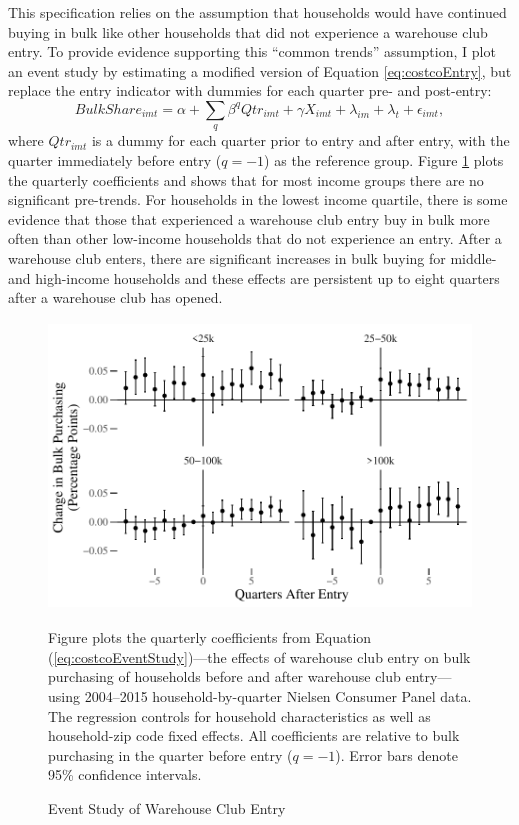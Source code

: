 \documentclass[AER]{AEA_mal}
\begin{document}
This specification relies on the assumption that households would have continued buying in bulk like other households that did not experience a warehouse club entry. To provide evidence supporting this ``common trends'' assumption, I plot an event study by estimating a modified version of Equation \ref{eq:costcoEntry}, but replace the entry indicator with dummies for each quarter pre- and post-entry:
\begin{equation}
\label{eq:costcoEventStudy}
BulkShare_{imt} = \alpha + \sum_q \beta^q Qtr_{imt} + \gamma X_{imt} + \lambda_{im} + \lambda_t + \epsilon_{imt},
\end{equation}
where $Qtr_{imt}$ is a dummy for each quarter prior to entry and after entry, with the quarter immediately before entry ($q = -1$) as the reference group. Figure \ref{fig:eventStudyIncome} plots the quarterly coefficients and shows that for most income groups there are no significant pre-trends. For households in the lowest income quartile, there is some evidence that those that experienced a warehouse club entry buy in bulk more often than other low-income households that do not experience an entry. After a warehouse club enters, there are significant increases in bulk buying for middle- and high-income households and these effects are persistent up to eight quarters after a warehouse club has opened.

\begin{figure}[!htb]
\centering
\caption{Event Study of Warehouse Club Entry}
\includegraphics[width = 4.9in, height = 3in]{../5_figures/eventStudyIncome15Mi.pdf}
\begin{figurenotes}
Figure plots the quarterly coefficients from Equation (\ref{eq:costcoEventStudy})---the effects of warehouse club entry on bulk purchasing of households before and after warehouse club entry---using 2004--2015 household-by-quarter Nielsen Consumer Panel data. The regression controls for household characteristics as well as household-zip code fixed effects. All coefficients are relative to bulk purchasing in the quarter before entry ($q = -1$). Error bars denote 95\% confidence intervals.
\end{figurenotes}
\label{fig:eventStudyIncome}
\end{figure}
\end{document}
